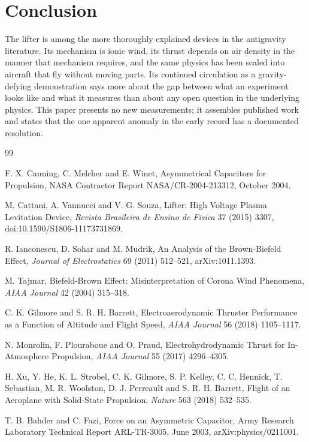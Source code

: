 \documentclass[11pt]{article}
\begin{document}
\section{Conclusion}

The lifter is among the more thoroughly explained devices in the antigravity literature. Its mechanism is ionic wind, its thrust depends on air density in the manner that mechanism requires, and the same physics has been scaled into aircraft that fly without moving parts. Its continued circulation as a gravity-defying demonstration says more about the gap between what an experiment looks like and what it measures than about any open question in the underlying physics. This paper presents no new measurements; it assembles published work and states that the one apparent anomaly in the early record has a documented resolution.

\begin{thebibliography}{99}

 F. X. Canning, C. Melcher and E. Winet, Asymmetrical Capacitors for Propulsion, NASA Contractor Report NASA/CR-2004-213312, October 2004.

 M. Cattani, A. Vannucci and V. G. Souza, Lifter: High Voltage Plasma Levitation Device, \emph{Revista Brasileira de Ensino de Fisica} 37 (2015) 3307, doi:10.1590/S1806-11173731869.

 R. Ianconescu, D. Sohar and M. Mudrik, An Analysis of the Brown-Biefeld Effect, \emph{Journal of Electrostatics} 69 (2011) 512--521, arXiv:1011.1393.

 M. Tajmar, Biefeld-Brown Effect: Misinterpretation of Corona Wind Phenomena, \emph{AIAA Journal} 42 (2004) 315--318.

 C. K. Gilmore and S. R. H. Barrett, Electroaerodynamic Thruster Performance as a Function of Altitude and Flight Speed, \emph{AIAA Journal} 56 (2018) 1105--1117.

 N. Monrolin, F. Plouraboue and O. Praud, Electrohydrodynamic Thrust for In-Atmosphere Propulsion, \emph{AIAA Journal} 55 (2017) 4296--4305.

 H. Xu, Y. He, K. L. Strobel, C. K. Gilmore, S. P. Kelley, C. C. Hennick, T. Sebastian, M. R. Woolston, D. J. Perreault and S. R. H. Barrett, Flight of an Aeroplane with Solid-State Propulsion, \emph{Nature} 563 (2018) 532--535.

 T. B. Bahder and C. Fazi, Force on an Asymmetric Capacitor, Army Research Laboratory Technical Report ARL-TR-3005, June 2003, arXiv:physics/0211001.

\end{thebibliography}
\end{document}
